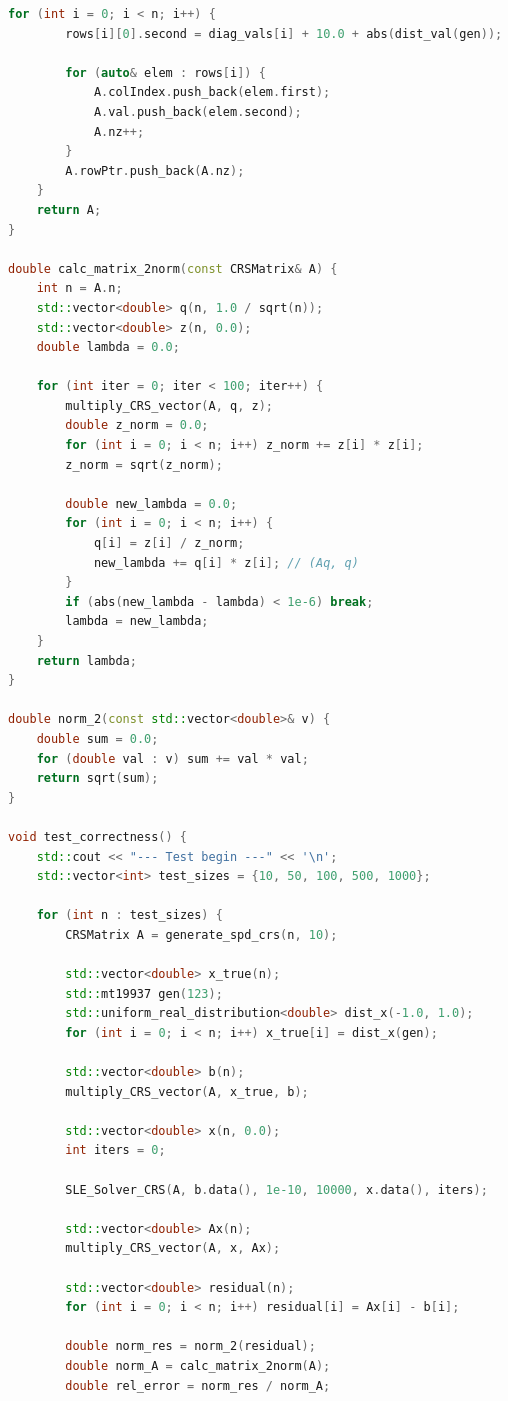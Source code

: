 \documentclass[12pt, a4paper]{article}
\begin{document}
\begin{lstlisting}[language=C++, frame=single]
    for (int i = 0; i < n; i++) {
        rows[i][0].second = diag_vals[i] + 10.0 + abs(dist_val(gen));
        
        for (auto& elem : rows[i]) {
            A.colIndex.push_back(elem.first);
            A.val.push_back(elem.second);
            A.nz++;
        }
        A.rowPtr.push_back(A.nz);
    }
    return A;
}

double calc_matrix_2norm(const CRSMatrix& A) {
    int n = A.n;
    std::vector<double> q(n, 1.0 / sqrt(n));
    std::vector<double> z(n, 0.0);
    double lambda = 0.0;

    for (int iter = 0; iter < 100; iter++) {
        multiply_CRS_vector(A, q, z);
        double z_norm = 0.0;
        for (int i = 0; i < n; i++) z_norm += z[i] * z[i];
        z_norm = sqrt(z_norm);
        
        double new_lambda = 0.0;
        for (int i = 0; i < n; i++) {
            q[i] = z[i] / z_norm;
            new_lambda += q[i] * z[i]; // (Aq, q)
        }
        if (abs(new_lambda - lambda) < 1e-6) break;
        lambda = new_lambda;
    }
    return lambda;
}

double norm_2(const std::vector<double>& v) {
    double sum = 0.0;
    for (double val : v) sum += val * val;
    return sqrt(sum);
}

void test_correctness() {
    std::cout << "--- Test begin ---" << '\n';
    std::vector<int> test_sizes = {10, 50, 100, 500, 1000};
    
    for (int n : test_sizes) {
        CRSMatrix A = generate_spd_crs(n, 10);
        
        std::vector<double> x_true(n);
        std::mt19937 gen(123);
        std::uniform_real_distribution<double> dist_x(-1.0, 1.0);
        for (int i = 0; i < n; i++) x_true[i] = dist_x(gen);
        
        std::vector<double> b(n);
        multiply_CRS_vector(A, x_true, b);
        
        std::vector<double> x(n, 0.0);
        int iters = 0;
        
        SLE_Solver_CRS(A, b.data(), 1e-10, 10000, x.data(), iters);
        
        std::vector<double> Ax(n);
        multiply_CRS_vector(A, x, Ax);
        
        std::vector<double> residual(n);
        for (int i = 0; i < n; i++) residual[i] = Ax[i] - b[i];
        
        double norm_res = norm_2(residual);
        double norm_A = calc_matrix_2norm(A);
        double rel_error = norm_res / norm_A;
        

\end{lstlisting}
\end{document}
